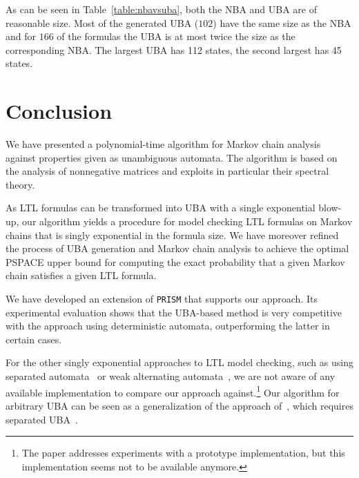 \documentclass{elsarticle}
\newcommand{\prism}{\texttt{PRISM}}
\begin{document}
As can be seen in Table~\ref{table:nbavsuba}, both the NBA and UBA are of reasonable size.
Most of the generated UBA ($102$) have the same size as the NBA and
for $166$ of the formulas the UBA is at most twice the size
as the corresponding NBA. The largest UBA has 112 states, the second
largest has 45 states.







 
\section{Conclusion}
\label{sec:conclusion}

We have presented a polynomial-time algorithm for Markov chain
analysis against properties given as unambiguous automata.  The
algorithm is based on the analysis of nonnegative matrices and
exploits in particular their spectral theory.

As LTL formulas can be transformed into UBA with a single exponential
blow-up, our algorithm yields a procedure for model checking LTL
formulas on Markov chains that is singly exponential in the formula
size.  We have moreover refined the process of UBA generation and
Markov chain analysis to achieve the optimal PSPACE upper bound for
computing the exact probability that a given Markov chain satisfies a
given LTL formula.



We have developed an extension of \prism{} that supports our approach.
Its experimental evaluation shows that the UBA-based method is very
competitive with the approach using deterministic automata,
outperforming the latter in certain cases.

For the other singly exponential approaches to LTL model checking,
such as using separated automata~\cite{CouSahSut03} or weak
alternating automata~\cite{BusRubVar04}, we are not aware of any
available implementation to compare our approach against.\footnote{The paper \cite{CouSahSut03} addresses experiments with a
  prototype implementation, but this implementation seems not to be
  available anymore.  } Our algorithm for arbitrary UBA can be seen as
a generalization of the approach of~\cite{CouSahSut03}, which requires
separated UBA~\cite{MuellerThesis18}.
\end{document}
